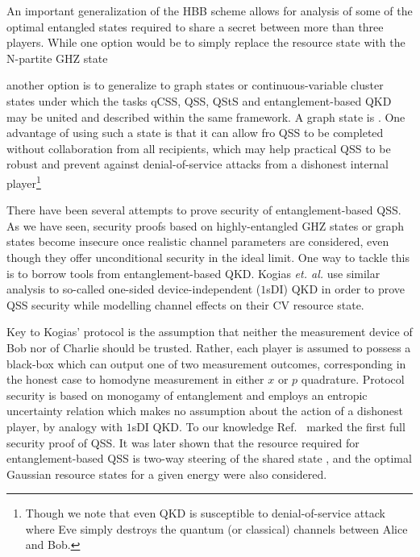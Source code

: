 An important generalization of the HBB scheme allows for analysis of some of the optimal entangled states required to share a secret between more than three players. While one option would be to simply replace the resource state with the N-partite GHZ state


\noindent another option is to generalize to graph states \cite{Markham2008a, Keet2010} or continuous-variable cluster states \cite{Lau2013, Wu2016} under which the tasks qCSS, QSS, QStS and entanglement-based QKD may be united and described within the same framework. A graph state is . One advantage of using such a state is that it can allow fro QSS to be completed without collaboration from all recipients, which may help practical QSS to be robust and prevent against denial-of-service attacks from a dishonest internal player\footnote{Though we note that even QKD is susceptible to denial-of-service attack where Eve simply destroys the quantum (or classical) channels between Alice and Bob.}

There have been several attempts to prove security of entanglement-based QSS. As we have seen, security proofs based on highly-entangled GHZ states or graph states become insecure once realistic channel parameters are considered, even though they offer unconditional security in the ideal limit. One way to tackle this is to borrow tools from entanglement-based QKD. Kogias \emph{et. al.} use similar analysis to so-called one-sided device-independent ($1$sDI) QKD \cite{Armstrong2015}  in order to prove QSS security while modelling channel effects on their CV resource state.

Key to Kogias' protocol is the assumption that neither the measurement device of Bob nor of Charlie should be trusted. Rather, each player is assumed to possess a black-box which can output one of two measurement outcomes, corresponding in the honest case to homodyne measurement in either $x$ or $p$ quadrature. Protocol security is based on monogamy of entanglement  and employs an entropic uncertainty relation which makes no assumption about the action of a dishonest player, by analogy with $1$sDI QKD. To our knowledge Ref.~\cite{Kogias2017} marked the first full security proof of QSS. It was later shown that the resource required for entanglement-based QSS is two-way steering of the shared state \cite{Xiang2017, Xiang2018}, and the optimal Gaussian resource states for a given energy were also considered. 

